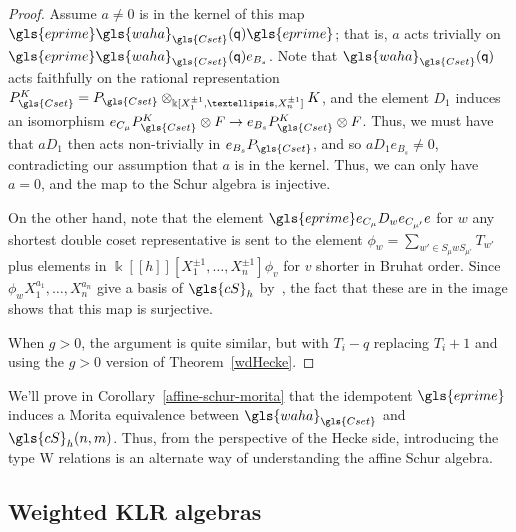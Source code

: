 \documentclass[10pt]{article}
\theoremstyle{definition}
\newcommand{\ck}{g}
\newcommand{\pq}{\mathsf{q}}
\newcommand{\K}{\Bbbk}%
\newcommand{\cS}{\gls{cS}}
\newcommand{\waha}{\gls{waha}}
\newcommand\llbracket{[\![}
\newcommand\rrbracket{]\!]}
\begin{document}
\begin{proof}
Assume $a\neq 0$ is in the kernel of this map 
$\gls{eprime} \waha_{\gls{Cset}}(\pq) \gls{eprime}$; that is, $a$ acts trivially on $\gls{eprime}
\waha_{\gls{Cset}}(\pq) e_{B_s}$. Note that
$\waha_{\gls{Cset}}(\pq)$ acts faithfully on the rational representation
$P^K_{\gls{Cset}}=P_{\gls{Cset}}\otimes_{\K[X_1^{\pm 1},\dots,X_n^{\pm 1}]}K$, and the element $D_1$ induces an isomorphism $
e_{C_{\mu} }P_{\gls{Cset}}^K\otimes F\to e_{B_s }P_{\gls{Cset}}^K\otimes
F$. Thus, we must have that $aD_1$ then acts non-trivially in $ e_{B_s }P_{\gls{Cset}}$, and so $aD_1e_{B_s }\neq 0$, contradicting our assumption that
$a$ is in the kernel.
Thus, we can only have $a=0$, and the map to the Schur algebra is injective.

On the other hand, note that the element $\gls{eprime}e_{C_\mu}D_we_{C_{\mu'}}e$
for $w$ any shortest double coset representative is sent to the element
$\phi_w=\sum_{w'\in S_{\mu}w S_{\mu'}}T_{w'}$ plus elements in
$\K\llbracket h\rrbracket [X^{\pm 1}_1,\dots, X^{\pm 1}_n]\phi_v$ for $v$ shorter in Bruhat
order. Since $\phi_w X^{a_1}_1,\dots, X^{a_n}_n$ give a basis of
$\cS_h$ by~\cite[2.2.2]{GreenSchur}, the fact that these are in the image shows that this map is
surjective.

When $\ck >0$, the argument is quite similar, but with $T_i-q$
replacing $T_i+1$ and using the $\ck>0$ version of Theorem~\ref{wdHecke}.
\end{proof}
We'll prove in Corollary~\ref{affine-schur-morita} that the idempotent
$\gls{eprime}$ induces a Morita equivalence between $\waha_{\gls{Cset}}$ and $\gls{cS}_h(n,m)$.
Thus, from the perspective of the Hecke side, introducing the type W
relations is an alternate way of understanding the affine Schur
algebra.

\subsection{Weighted KLR algebras}
\label{sec:weight-klr-algebr}
\end{document}
